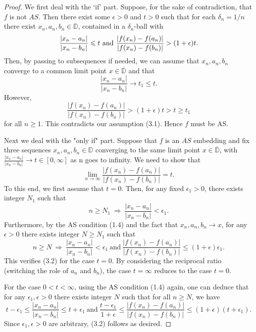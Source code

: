 \documentclass[11pt]{amsart}
\numberwithin{equation}{section}
\theoremstyle{plain}
\theoremstyle{step}
\def\leq{\leqslant}
\def\geq{\geqslant}
\newcommand{\abs}[1]{\lvert#1\rvert}
\newcommand{\D}{\mathbb{D}}
\renewcommand{\bar}[1]{\overline{#1}}
\begin{document}
\begin{proof}
We first deal with the `if' part.
    Suppose, for the sake of contradiction, that $f$ is not $AS$. Then there exist some $\epsilon>0$ and $t>0$ such that for each $\delta_n=1/n$ there exist $x_n,a_n,b_n\in\D$, contained in a $\delta_n$-ball with
    \[
    \frac{\abs{x_n-a_n}}{\abs{x_n-b_n}}\leq t \ \text{and\  } \\\frac{\abs{f(x_n)-f(a_n)}}{\abs{f(x_n)-f(b_n)}}> (1+\epsilon)t.
    \]
    Then, by passing to subsequences if needed, we can assume that $x_n,a_n,b_n$ converge to a common limit point $x\in\bar\D$ and that 
    \[
    \frac{\abs{x_n-a_n}}{\abs{x_n-b_n}}\to t_{1}\leq t.
    \]
    However,
    \[
    \frac{\abs{f(x_n)-f(a_n)}}{\abs{f(x_n)-f(b_n)}}> (1+\epsilon)t> t\geq t_{1}
    \]
  for all $n\geq 1$. This contradicts our assumption (3.1). Hence $f$ must be AS.

\vspace{0.2cm}
Next we deal with the "only if" part.  
Suppose that $f$ is an $AS$ embedding and fix three sequences $x_n,a_n,b_n\in\D$ converging to the same limit point $x\in\bar\D$, with $\frac{\abs{x_n-a_n}}{\abs{x_n-b_n}}\to t\in [0,\infty]$ as n goes to infinity. We need to show that 
\begin{equation}
\lim_{n\rightarrow\infty}\frac{\abs{f(x_n)-f(a_n)}}{\abs{f(x_n)-f(b_n)}}=t.
\end{equation}
To this end, we first assume that $t=0$. Then, for any fixed $\epsilon_1>0$, there exists integer $N_1$ such that 
$$n\geq N_1 \ \Rightarrow \ \frac{\abs{x_n-a_n}}{\abs{x_n-b_n}}<\epsilon_1. $$
Furthermore, by the AS condition (1.4) and the fact that $x_n,a_n,b_n\rightarrow x$, for any $\epsilon>0$ there exists integer $N\geq N_1$ such that 
$$n\geq N \ \Rightarrow \ \frac{\abs{x_n-a_n}}{\abs{x_n-b_n}}<\epsilon_1 \ 
 \text{and} \ \frac{\abs{f(x_n)-f(a_n)}}{\abs{f(x_n)-f(b_n)}}\leq (1+\epsilon)\epsilon_1. $$
 This verifies (3.2) for the case $t=0$. By considering the reciprocal ratio (switching the role of $a_n$ and $b_n$), the case $t=\infty$ reduces to the case $t=0$. 

 For the case $0<t<\infty$, using the AS condition (1.4) again, one can deduce that for any $\epsilon_1,\epsilon>0$ there exists integer $N$ such that for all $n\geq N$, we have 
\begin{equation}\label{two_sided_AS}
t-\epsilon_1\leq \frac{\abs{x_n-a_n}}{\abs{x_n-b_n}}\leq t+\epsilon_1 \
\text{and} \ \frac{t-\epsilon_1}{1+\epsilon}\leq \frac{\abs{f(x_n)-f(a_n)}}{\abs{f(x_n)-f(b_n)}}\leq (1+\epsilon)(t+\epsilon_1). 
\end{equation}
 Since $\epsilon_1, \epsilon>0$ are arbitrary, (3.2) follows as desired.
\end{proof}
\end{document}
